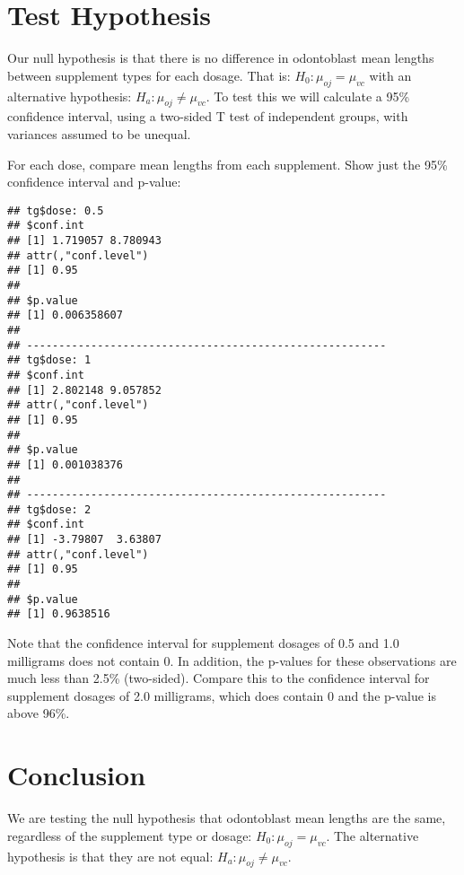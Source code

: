 \documentclass[legalpaper]{article}
\newenvironment{Shaded}{\begin{snugshade}}{\end{snugshade}}
\newcommand{\KeywordTok}[1]{\textcolor[rgb]{0.13,0.29,0.53}{\textbf{{#1}}}}
\newcommand{\StringTok}[1]{\textcolor[rgb]{0.31,0.60,0.02}{{#1}}}
\newcommand{\NormalTok}[1]{{#1}}
\begin{document}
\section{Test Hypothesis}\label{test-hypothesis}

Our null hypothesis is that there is no difference in odontoblast mean
lengths between supplement types for each dosage. That is:
\(H_0 : \mu_{oj} = \mu_{vc}\) with an alternative hypothesis:
\(H_a : \mu_{oj} \ne \mu_{vc}\). To test this we will calculate a 95\%
confidence interval, using a two-sided T test of independent groups,
with variances assumed to be unequal.

For each dose, compare mean lengths from each supplement. Show just the
95\% confidence interval and p-value:

\begin{Shaded}
\end{Shaded}

\begin{verbatim}
## tg$dose: 0.5
## $conf.int
## [1] 1.719057 8.780943
## attr(,"conf.level")
## [1] 0.95
## 
## $p.value
## [1] 0.006358607
## 
## -------------------------------------------------------- 
## tg$dose: 1
## $conf.int
## [1] 2.802148 9.057852
## attr(,"conf.level")
## [1] 0.95
## 
## $p.value
## [1] 0.001038376
## 
## -------------------------------------------------------- 
## tg$dose: 2
## $conf.int
## [1] -3.79807  3.63807
## attr(,"conf.level")
## [1] 0.95
## 
## $p.value
## [1] 0.9638516
\end{verbatim}

Note that the confidence interval for supplement dosages of 0.5 and 1.0
milligrams does not contain 0. In addition, the p-values for these
observations are much less than 2.5\% (two-sided). Compare this to the
confidence interval for supplement dosages of 2.0 milligrams, which does
contain 0 and the p-value is above 96\%.

\section{Conclusion}\label{conclusion}

We are testing the null hypothesis that odontoblast mean lengths are the
same, regardless of the supplement type or dosage:
\(H_0 : \mu_{oj} = \mu_{vc}\). The alternative hypothesis is that they
are not equal: \(H_a : \mu_{oj} \ne \mu_{vc}\).
\end{document}
